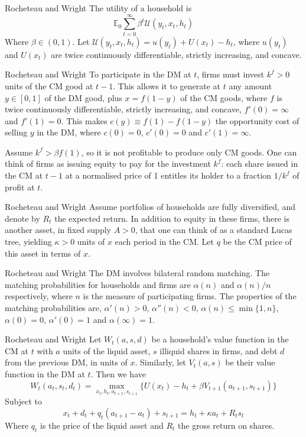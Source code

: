 \documentclass[aspectratio=169,xcolor=dvipsnames]{beamer}
\begin{document}
\begin{frame}{Rocheteau and Wright}
    The utility of a household is
    \[
        \mathbb{E}_0 \sum_{t=0}^\infty \beta^t \mathcal{U}(y_t, x_t, h_t)
    \]
    Where $\beta \in (0, 1)$. Let $\mathcal{U}(y_t, x_t, h_t) = u(y_t) + U(x_t) - h_t$, where $u(y_t)$ and $U(x_t)$ are twice continuously differentiable, strictly increasing, and concave.
\end{frame}

\begin{frame}{Rocheteau and Wright}
    To participate in the DM at $t$, firms must invest $k^f > 0$ units of the CM good at $t-1$. This allows it to generate at $t$ any amount $y \in [0,1]$ of the DM good, plus $x = f(1 - y)$ of the CM goods, where $f$ is twice continuously differentiable, strictly increasing, and concave, $f'(0) = \infty$ and $f'(1) = 0$. This makes $c(y) \equiv f(1) - f(1-y)$ the opportunity cost of selling $y$ in the DM, where $c(0) = 0$, $c'(0) = 0$ and $c'(1) = \infty$.

    Assume $k^f > \beta f(1)$, so it is not profitable to produce only CM goods. One can think of firms as issuing equity to pay for the investment $k^f$: each share issued in the CM at $t-1$ at a normalised price of 1 entitles its holder to a fraction $1/k^f$ of profit at $t$.
\end{frame}

\begin{frame}{Rocheteau and Wright}
    Assume portfolios of households are fully diversified, and denote by $R_t$ the expected return. In addition to equity in these firms, there is another asset, in fixed supply $A > 0$, that one can think of as a standard Lucas tree, yielding $\kappa > 0$ units of $x$ each period in the CM. Let $q$ be the CM price of this asset in terms of $x$.
\end{frame}

\begin{frame}{Rocheteau and Wright}
    The DM involves bilateral random matching. The matching probabilities for households and firms are $\alpha(n)$ and $\alpha(n)/n$ respectively, where $n$ is the measure of participating firms. The properties of the matching probabilities are, $\alpha'(n) > 0$, $\alpha''(n) < 0$, $\alpha(n) \le \min\{1, n\}$, $\alpha(0) = 0$, $\alpha'(0) = 1$ and $\alpha(\infty) = 1$.
\end{frame}

\begin{frame}{Rocheteau and Wright}
    Let $W_t(a, s, d)$ be a household's value function in the CM at $t$ with $a$ units of the liquid asset, $s$ illiquid shares in firms, and debt $d$ from the previous DM, in units of $x$. Similarly, let $V_t(a, s)$ be their value function in the DM at $t$. Then we have
    \[
        W_t(a_t, s_t, d_t) = \max_{x_t, h_t, a_{t+1}, s_{t+1}} \{U(x_t) - h_t + \beta V_{t+1}(a_{t+1}, s_{t+1})\}
    \]
    Subject to
    \[
        x_t + d_t + q_t(a_{t+1} - a_t) + s_{t+1} = h_t + \kappa a_t + R_t s_t
    \]
    Where $q_t$ is the price of the liquid asset and $R_t$ the gross return on shares.
\end{frame}
\end{document}
